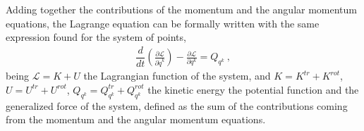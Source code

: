 \documentclass[letterpaper,10pt,english]{jupyterBook}
\begin{document}
\sphinxAtStartPar
Adding together the contributions of the momentum and the angular momentum equations, the Lagrange equation can be formally written with the same expression found for the system of points,
\begin{equation*}
\begin{split}\dfrac{d}{dt}\left(\frac{\partial \mathscr{L}}{\partial \dot{q}^k}\right) - \frac{\partial \mathscr{L}}{\partial q^k} = Q_{q^k} \ ,\end{split}
\end{equation*}
\sphinxAtStartPar
being \(\mathscr{L} = K + U\) the Lagrangian function of the system, and \(K = K^{tr} + K^{rot}\), \(U = U^{tr} + U^{rot}\), \(Q_{q^k} = Q_{q^k}^{tr} + Q_{q^k}^{rot}\) the kinetic energy the potential function and the generalized force of the system, defined as the sum of the contributions coming from the momentum and the angular momentum equations.



\sphinxstepscope
\end{document}
